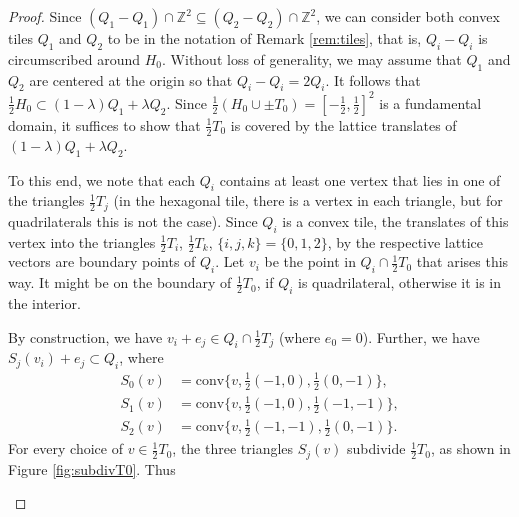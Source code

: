 \documentclass[11pt, a4paper]{amsart}
\newcommand{\ZZ}{\mathbb{Z}}
\newcommand{\conv}{\mathrm{conv}}
\numberwithin{equation}{section}
\theoremstyle{plain}
\begin{document}
\begin{proof}
Since $(Q_1-Q_1)\cap\ZZ^2 \subseteq (Q_2-Q_2)\cap\ZZ^2$, we can consider both convex tiles $Q_1$ and $Q_2$ to be in the notation of Remark \ref{rem:tiles}, that is, $Q_i-Q_i$ is circumscribed around $H_0$.
Without loss of generality, we may assume that $Q_1$ and $Q_2$ are centered at the origin so that $Q_i - Q_i = 2Q_i$. It follows that $\tfrac 12 H_0 \subset (1-\lambda)Q_1 + \lambda Q_2$. Since $\tfrac 12 (H_0 \cup \pm T_0) = [-\frac12, \frac12]^2$ is a fundamental domain, it suffices to show that $\frac 12 T_0$ is covered by the lattice translates of $(1-\lambda)Q_1 + \lambda Q_2$.


To this end, we note that each $Q_i$ contains at least one vertex that lies in one of the triangles $\tfrac 12 T_j$ (in the hexagonal tile, there is a vertex in each triangle, but for quadrilaterals this is not the case). Since $Q_i$ is a convex tile, the translates of this vertex into the triangles $\frac 12 T_i$, $\frac 12 T_k$, $\{i,j,k\}=\{0,1,2\}$, by the respective lattice vectors are boundary points of $Q_i$. Let $v_i$ be the point in $Q_i\cap \frac 12 T_0$ that arises this way. It might be on the boundary of $\frac12 T_0$, if $Q_i$ is quadrilateral, otherwise it is in the interior.

By construction, we have $v_i + e_j \in Q_i \cap \frac12 T_j$ (where $e_0=0$). Further, we have $S_j(v_i) + e_j \subset Q_i$, where
\[
\begin{split}
S_{0}(v) &= \conv\{v, \tfrac 12 (-1,0), \tfrac 12 (0,-1)\},\\
S_{1}(v) &= \conv\{v, \tfrac 12 (-1,0), \tfrac 12 (-1,-1)\},\\
S_{2}(v) &= \conv\{v, \tfrac 12 (-1,-1),\tfrac 12 (0,-1)\}.
\end{split}
\] 
For every choice of $v\in \tfrac 12 T_0$, the three triangles $S_j(v)$ subdivide $\tfrac 12 T_0$, as shown in Figure \ref{fig:subdivT0}. Thus
\begin{figure}
\centering
\begin{minipage}{0.45\textwidth}
\centering
\end{minipage}
\end{figure}
\end{proof}
\end{document}
